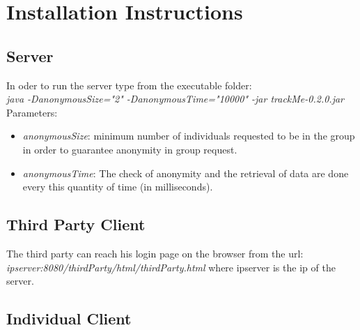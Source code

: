 \section{Installation Instructions} 

\subsection{Server}
In oder to run the server type from the executable folder: \\
\textit{java -DanonymousSize="2" -DanonymousTime="10000" -jar trackMe-0.2.0.jar}
Parameters:
\begin{itemize}
	\item \textit{anonymousSize}: minimum number of individuals requested to be in the group in order to guarantee anonymity in group request.
	\item \textit{anonymousTime}: The check of anonymity and the retrieval of data are done every this quantity of time (in milliseconds).
\end{itemize}

\subsection{Third Party Client}
The third party can reach his login page on the browser from the url: \textit{ipserver:8080/thirdParty/html/thirdParty.html} where ipserver is the ip of the server.

\subsection{Individual Client}
